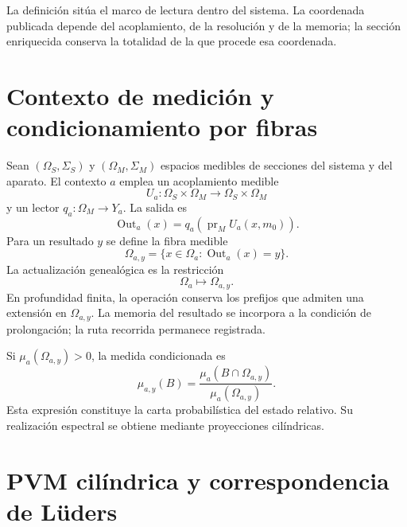 La definici\'on sit\'ua el marco de lectura dentro del sistema. La
coordenada publicada depende del acoplamiento, de la resoluci\'on y de la
memoria; la secci\'on enriquecida conserva la totalidad de la que procede esa
coordenada.

\section{Contexto de medici\'on y condicionamiento por fibras}

Sean \((\Omega_S,\Sigma_S)\) y \((\Omega_M,\Sigma_M)\) espacios medibles
de secciones del sistema y del aparato. El contexto \(a\) emplea un
acoplamiento medible
\begin{equation}
 U_a:\Omega_S\times\Omega_M
 \longrightarrow\Omega_S\times\Omega_M
 \label{eq:rm-obs-measurable-coupling}
\end{equation}
y un lector \(q_a:\Omega_M\to Y_a\). La salida es
\begin{equation}
 \operatorname{Out}_a(x)
 =q_a\!\left(\operatorname{pr}_M U_a(x,m_0)\right).
 \label{eq:rm-obs-output}
\end{equation}
Para un resultado \(y\) se define la fibra medible
\begin{equation}
 \Omega_{a,y}
 =\{x\in\Omega_a:\operatorname{Out}_a(x)=y\}.
 \label{eq:rm-obs-outcome-fiber}
\end{equation}
La actualizaci\'on geneal\'ogica es la restricci\'on
\begin{equation}
 \Omega_a\longmapsto\Omega_{a,y}.
 \label{eq:rm-obs-genealogical-update}
\end{equation}
En profundidad finita, la operaci\'on conserva los prefijos que admiten una
extensi\'on en \(\Omega_{a,y}\). La memoria del resultado se incorpora a la
condici\'on de prolongaci\'on; la ruta recorrida permanece registrada.

Si \(\mu_a(\Omega_{a,y})>0\), la medida condicionada es
\begin{equation}
 \mu_{a,y}(B)
 =\frac{\mu_a(B\cap\Omega_{a,y})}
 {\mu_a(\Omega_{a,y})}.
 \label{eq:rm-obs-conditional-measure}
\end{equation}
Esta expresi\'on constituye la carta probabil\'istica del estado relativo.
Su realizaci\'on espectral se obtiene mediante proyecciones cil\'indricas.

\section{PVM cil\'indrica y correspondencia de L\"uders}

